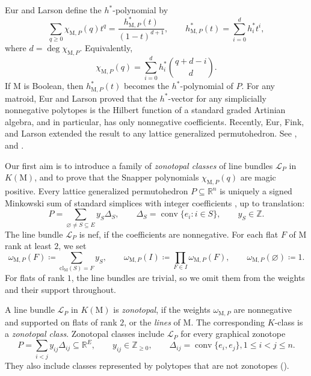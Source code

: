 \documentclass[11pt,a4paper,reqno]{amsart}
\theoremstyle{results}
\theoremstyle{definitions}
\def\Z{\mathbb{Z}}
\def\R{\mathbb{R}}
\def\Z{\mathbb{Z}}
\newcommand{\cl}{\textrm{cl}}
\newcommand{\M}{\mathrm{M}}
\renewcommand{\L}{\mathcal{L}}
\newcommand{\hstar}{h^{*}}
\newcommand{\cL}{\mathcal{L}}
\begin{document}
Eur and Larson \cite{eur2023k} define the
$\hstar$-polynomial by
\begin{equation}\label{eq:hstar-def}
  \sum_{q\geqslant0}\chi_{\M,P}(q)t^q
  =\frac{\hstar_{\M,P}(t)}{(1-t)^{d+1}},
  \qquad
  \hstar_{\M,P}(t)=\sum_{i=0}^d\hstar_i t^i, 
\end{equation}
where $d=\deg\chi_{\M,P}$. Equivalently,
\begin{equation}
  \label{eq:Wf-change-of-basis}
  \chi_{\M,P}(q)=\sum_{i=0}^d\hstar_i\binom{q+d-i}{d}.
\end{equation}
If $\M$ is Boolean, then $\hstar_{\M,P}(t)$ becomes the $\hstar$-polynomial of $P$. For any matroid, 
Eur and Larson proved that the $\hstar$-vector for any simplicially nonnegative polytopes is the
Hilbert function of a standard graded Artinian algebra, and in particular, has only nonnegative coefficients. 
Recently, Eur, Fink, and Larson extended the result to any lattice generalized permutohedron. See \cite[Theorem 1.5]{eur2023k}, and \cite[Theorem B]{eurfinklarson2025}.

Our first aim is to introduce a family of \emph{zonotopal classes} of line bundles $\L_P$ in $K(\M)$, and to prove that the Snapper polynomials $\chi_{\M, P}(q)$ are magic positive. 
Every lattice generalized permutohedron $P \subseteq \R^{n}$ is uniquely a signed Minkowski sum of standard simplices with integer coefficients
\cite[Proposition 2.4]{ardila2010matroid}, up to translation: 
\[
  P=\sum_{\varnothing\ne S\subseteq E}y_S\Delta_S,
  \qquad \Delta_S=\operatorname{conv}\{e_i:i\in S\},
  \qquad y_S\in\Z. 
\]
The line bundle $\cL_{P}$ is nef, if the coefficients are nonnegative. 
For each flat $F$ of $\M$ rank at least $2$, we set 
\[
  \omega_{\M, P}(F) \coloneqq \sum_{\cl_{\M}(S)=F}y_S,
  \qquad \omega_{\M, P}(I) \coloneqq \prod_{F\in I}\omega_{\M, P}(F),
  \qquad \omega_{\M, P}(\varnothing) \coloneqq 1.
\]
For flats of rank $1$, the line bundles are trivial, so we omit them from the weights
and their support throughout. 

A line bundle $\L_{P}$ in $K(\M)$ is \emph{zonotopal}, if the weights $\omega_{\M, P}$ are nonnegative and supported on flats of rank $2$, or the \emph{lines} of $\M$. The corresponding $K$-class is a \emph{zonotopal class}. Zonotopal classes include $\cL_{P}$ for every graphical zonotope
\[
  P=\sum_{i<j}y_{ij}\Delta_{ij}\subseteq\R^E,
  \qquad y_{ij}\in\Z_{\geqslant0}, \qquad \Delta_{ij}=\operatorname{conv}\{e_i,e_j\}, 1 \leqslant i < j \leqslant n. 
\]
They also include classes represented by polytopes that are not zonotopes
(). 
\end{document}
